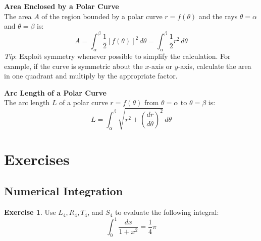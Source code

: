\documentclass[11pt]{article}
\theoremstyle{definition}
\newtheorem{exercise}{Exercise}[section]
\begin{document}
\textbf{Area Enclosed by a Polar Curve} \\
The area $A$ of the region bounded by a polar curve $r=f(\theta)$ and the rays $\theta=\alpha$ and $\theta=\beta$ is:
\[
A = \int_{\alpha}^{\beta} \frac{1}{2} [f(\theta)]^2 \,d\theta = \int_{\alpha}^{\beta} \frac{1}{2} r^2 \,d\theta
\]
\textit{Tip}: Exploit symmetry whenever possible to simplify the calculation. For example, if the curve is symmetric about the $x$-axis or $y$-axis, calculate the area in one quadrant and multiply by the appropriate factor.

\textbf{Arc Length of a Polar Curve} \\
The arc length $L$ of a polar curve $r=f(\theta)$ from $\theta=\alpha$ to $\theta=\beta$ is:
\[
L = \int_{\alpha}^{\beta} \sqrt{r^2 + \left(\frac{dr}{d\theta}\right)^2} \,d\theta
\]

\section{Exercises}

\subsection{Numerical Integration}

\begin{exercise}
Use $L_4, R_4, T_4$, and $S_4$ to evaluate the following integral:
\[
\int_0^1\frac{dx}{1+x^2}=\frac{1}{4}\pi
\]
\end{exercise}
\end{document}
